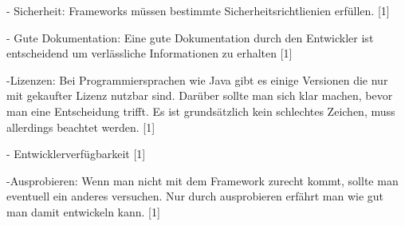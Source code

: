 - Sicherheit: Frameworks müssen bestimmte Sicherheitsrichtlienien erfüllen. [1]

- Gute Dokumentation: Eine gute Dokumentation durch den Entwickler ist entscheidend um verlässliche Informationen zu erhalten [1]

-Lizenzen: Bei Programmiersprachen wie Java gibt es einige Versionen die nur mit gekaufter Lizenz nutzbar sind. Darüber sollte man sich klar machen, bevor man eine Entscheidung trifft. Es ist grundsätzlich kein schlechtes Zeichen, muss allerdings beachtet werden. [1]

- Entwicklerverfügbarkeit [1]

-Ausprobieren: Wenn man nicht mit dem Framework zurecht kommt, sollte man eventuell ein anderes versuchen. Nur durch ausprobieren erfährt man wie gut man damit entwickeln kann. [1]
